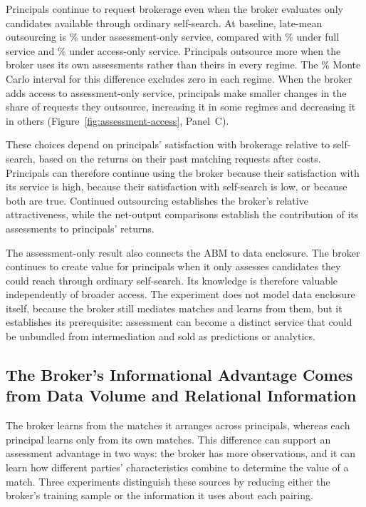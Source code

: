 Principals continue to request brokerage even when the broker evaluates only candidates available through ordinary self-search. At baseline, late-mean outsourcing is \% under assessment-only service, compared with \% under full service and \% under access-only service. Principals outsource more when the broker uses its own assessments rather than theirs in every regime. The \% Monte Carlo interval for this difference excludes zero in each regime. When the broker adds access to assessment-only service, principals make smaller changes in the share of requests they outsource, increasing it in some regimes and decreasing it in others (Figure~\ref{fig:assessment-access}, Panel~C).

These choices depend on principals' satisfaction with brokerage relative to self-search, based on the returns on their past matching requests after costs. Principals can therefore continue using the broker because their satisfaction with its service is high, because their satisfaction with self-search is low, or because both are true. Continued outsourcing establishes the broker's relative attractiveness, while the net-output comparisons establish the contribution of its assessments to principals' returns.

The assessment-only result also connects the ABM to data enclosure. The broker continues to create value for principals when it only assesses candidates they could reach through ordinary self-search. Its knowledge is therefore valuable independently of broader access. The experiment does not model data enclosure itself, because the broker still mediates matches and learns from them, but it establishes its prerequisite: assessment can become a distinct service that could be unbundled from intermediation and sold as predictions or analytics.

\subsection{The Broker's Informational Advantage Comes from Data Volume and Relational Information}

The broker learns from the matches it arranges across principals, whereas each principal learns only from its own matches. This difference can support an assessment advantage in two ways: the broker has more observations, and it can learn how different parties' characteristics combine to determine the value of a match. Three experiments distinguish these sources by reducing either the broker's training sample or the information it uses about each pairing.

